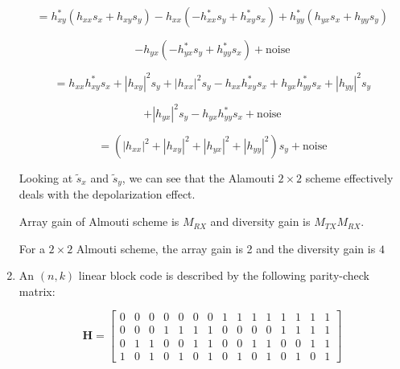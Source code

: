 \documentclass[fleqn]{article}
\makeatletter
\newenvironment{equationCenter}{\@fleqnfalse\begin{equation*}}{\end{equation*}}
\makeatother
\begin{document}
\begin{enumerate}
		\begin{equation*}
			= h_{xy}^*(h_{xx}s_x + h_{xy}s_y) - h_{xx}(-h_{xx}^*s_y + h_{xy}^*s_x) + h_{yy}^*(h_{yx}s_x + h_{yy}s_y)
		\end{equation*}
		
		\begin{equation*}
			- h_{yx}(-h_{yx}^*s_y + h_{yy}^*s_x) + \text{noise}
		\end{equation*}
		
		\begin{equation*}
			= h_{xx}h_{xy}^*s_x + |h_{xy}|^2s_y + |h_{xx}|^2s_y - h_{xx}h_{xy}^*s_x + h_{yx}h_{yy}^*s_x + |h_{yy}|^2s_y
		\end{equation*}
		
		\begin{equation*}
			+ |h_{yx}|^2s_y - h_{yx}h_{yy}^*s_x + \text{noise}
		\end{equation*}
		
		\begin{equation*}
			= (|h_{xx}|^2 + |h_{xy}|^2 + |h_{yx}|^2 + |h_{yy}|^2)s_y + \text{noise}
		\end{equation*}
		
		Looking at $\tilde{s}_x$ and $\tilde{s}_y$, we can see that the Alamouti $2\times 2$ scheme effectively deals with the depolarization effect.
		
		\pagebreak
		
%		
%		

		Array gain of Almouti scheme is $M_{RX}$ and diversity gain is $M_{TX}M_{RX}$.
		
		For a $2 \times 2$ Almouti scheme, the array gain is 2 and the diversity gain is $4$		
		
		\item An $(n,k)$ linear block code is described by the following parity-check matrix:
		
		\begin{equationCenter}
			\mathbf{H} = \begin{bmatrix}
				0 & 0 & 0 & 0 & 0 & 0 & 0 & 1 & 1 & 1 & 1 & 1 & 1 & 1 & 1 \\
				0 & 0 & 0 & 1 & 1 & 1 & 1 & 0 & 0 & 0 & 0 & 1 & 1 & 1 & 1 \\
				0 & 1 & 1 & 0 & 0 & 1 & 1 & 0 & 0 & 1 & 1 & 0 & 0 & 1 & 1 \\
				1 & 0 & 1 & 0 & 1 & 0 & 1 & 0 & 1 & 0 & 1 & 0 & 1 & 0 & 1
			\end{bmatrix}
		\end{equationCenter}
		

\end{enumerate}
\end{document}
